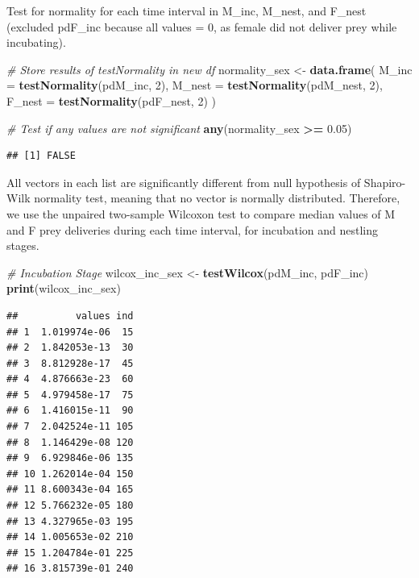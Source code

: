 \documentclass[]{article}
\newenvironment{Shaded}{\begin{snugshade}}{\end{snugshade}}
\newcommand{\CommentTok}[1]{\textcolor[rgb]{0.56,0.35,0.01}{\textit{#1}}}
\newcommand{\DataTypeTok}[1]{\textcolor[rgb]{0.13,0.29,0.53}{#1}}
\newcommand{\DecValTok}[1]{\textcolor[rgb]{0.00,0.00,0.81}{#1}}
\newcommand{\FloatTok}[1]{\textcolor[rgb]{0.00,0.00,0.81}{#1}}
\newcommand{\KeywordTok}[1]{\textcolor[rgb]{0.13,0.29,0.53}{\textbf{#1}}}
\newcommand{\NormalTok}[1]{#1}
\newcommand{\OperatorTok}[1]{\textcolor[rgb]{0.81,0.36,0.00}{\textbf{#1}}}
\newcommand{\StringTok}[1]{\textcolor[rgb]{0.31,0.60,0.02}{#1}}
\begin{document}
Test for normality for each time interval in M\_inc, M\_nest, and
F\_nest (excluded pdF\_inc because all values = 0, as female did not
deliver prey while incubating).

\begin{Shaded}
\begin{Highlighting}[]
\CommentTok{# Store results of testNormality in new df}
\NormalTok{normality_sex <-}\StringTok{ }\KeywordTok{data.frame}\NormalTok{(}
  \DataTypeTok{M_inc =} \KeywordTok{testNormality}\NormalTok{(pdM_inc, }\DecValTok{2}\NormalTok{), }
  \DataTypeTok{M_nest =} \KeywordTok{testNormality}\NormalTok{(pdM_nest, }\DecValTok{2}\NormalTok{), }
  \DataTypeTok{F_nest =} \KeywordTok{testNormality}\NormalTok{(pdF_nest, }\DecValTok{2}\NormalTok{)}
\NormalTok{  )}

\CommentTok{# Test if any values are not significant}
\KeywordTok{any}\NormalTok{(normality_sex }\OperatorTok{>=}\StringTok{ }\FloatTok{0.05}\NormalTok{)}
\end{Highlighting}
\end{Shaded}

\begin{verbatim}
## [1] FALSE
\end{verbatim}

All vectors in each list are significantly different from null
hypothesis of Shapiro-Wilk normality test, meaning that no vector is
normally distributed. Therefore, we use the unpaired two-sample Wilcoxon
test to compare median values of M and F prey deliveries during each
time interval, for incubation and nestling stages.

\begin{Shaded}
\begin{Highlighting}[]
\CommentTok{# Incubation Stage}
\NormalTok{wilcox_inc_sex <-}\StringTok{ }\KeywordTok{testWilcox}\NormalTok{(pdM_inc, pdF_inc)}
\KeywordTok{print}\NormalTok{(wilcox_inc_sex)}
\end{Highlighting}
\end{Shaded}

\begin{verbatim}
##          values ind
## 1  1.019974e-06  15
## 2  1.842053e-13  30
## 3  8.812928e-17  45
## 4  4.876663e-23  60
## 5  4.979458e-17  75
## 6  1.416015e-11  90
## 7  2.042524e-11 105
## 8  1.146429e-08 120
## 9  6.929846e-06 135
## 10 1.262014e-04 150
## 11 8.600343e-04 165
## 12 5.766232e-05 180
## 13 4.327965e-03 195
## 14 1.005653e-02 210
## 15 1.204784e-01 225
## 16 3.815739e-01 240
\end{verbatim}
\end{document}
